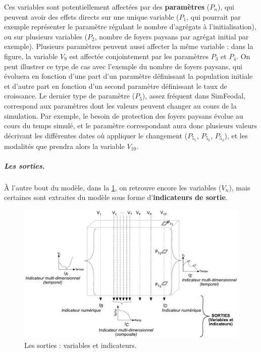 Ces variables sont potentiellement affectées par des \textbf{paramètres} ($P_n$), qui peuvent avoir des effets directs sur une unique variable ($P_1$, qui pourrait par exemple représenter le paramètre régulant le nombre d'agrégats à l'initialisation), ou sur plusieurs variables ($P_2$, nombre de foyers paysans par agrégat initial par exemple).
Plusieurs paramètres peuvent aussi affecter la même variable : dans la figure, la variable $V_9$ est affectée conjointement par les paramètres $P_3$ et $P_4$.
On peut illustrer ce type de cas avec l'exemple du nombre de foyers paysans, qui évoluera en fonction d'une part d'un paramètre définissant la population initiale et d'autre part en fonction d'un second paramètre définissant le taux de croissance.
Le dernier type de paramètre ($P_5$), assez fréquent dans SimFeodal, correspond aux paramètres dont les valeurs peuvent changer au cours de la simulation.
Par exemple, le besoin de protection des foyers paysans évolue au cours du temps simulé, et le paramètre correspondant aura donc plusieurs valeurs décrivant les différentes dates où appliquer le changement ($P_{5_1}$, $P_{5_2}$, $P_{5_3}$), et les modalités que prendra alors la variable $V_{10}$.


\subparagraph{Les sorties.}
À l'autre bout du modèle, dans la \cref{fig:parametres-these-sorties}, on retrouve encore les variables ($V_n$), mais certaines sont extraites du modèle sous forme d'\textbf{indicateurs de sortie}.

\begin{figure}[H]
	\includegraphics[width=\linewidth]{img/schemas_params_2_sorties.pdf}
	\caption{Les sorties : variables et indicateurs.} 
	\label{fig:parametres-these-sorties} 
\end{figure}

